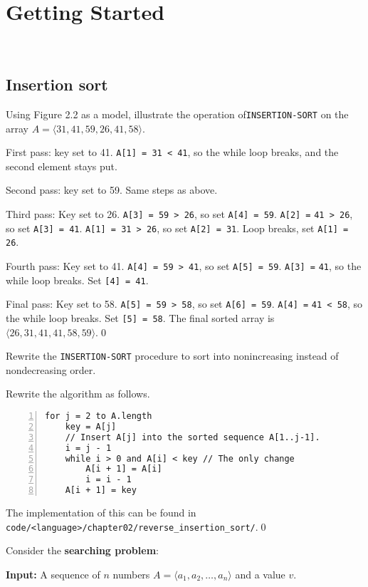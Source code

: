 \chapter{Getting Started}\,
\section{Insertion sort}

 Using Figure 2.2 as a model, illustrate the operation of\newline \verb|INSERTION-SORT| on the array $A = \langle 31, 41, 59, 26, 41, 58\rangle$.

\sol First pass: key set to 41. \verb|A[1] = 31 < 41|, so the while loop breaks, and the second element stays put.

Second pass: key set to 59. Same steps as above.

Third pass: Key set to 26. \verb|A[3] = 59 > 26|, so set \verb|A[4] = 59|. \verb|A[2] =| \verb|41 > 26|, so set \verb|A[3] = 41|. \verb|A[1] = 31 > 26|, so set \verb|A[2] = 31|. Loop breaks, set \verb|A[1] = 26|.

Fourth pass: Key set to 41. \verb|A[4] = 59 > 41|, so set \verb|A[5] = 59|. \verb|A[3] =| \verb|41|, so the while loop breaks. Set \verb|[4] = 41|.

Final pass: Key set to 58. \verb|A[5] = 59 > 58|, so set \verb|A[6] = 59|. \verb|A[4] =| \verb|41 < 58|, so the while loop breaks. Set \verb|[5] = 58|. The final sorted array is $\langle 26, 31, 41, 41, 58, 59\rangle$.\qed

 Rewrite the \verb|INSERTION-SORT| procedure to sort into nonincreasing instead of nondecreasing order.

\sol Rewrite the algorithm as follows.
\begin{Verbatim}[frame=single,numbers=left,samepage=true,label=REVERSE-INSERTION-SORT(A)]
for j = 2 to A.length
    key = A[j]
    // Insert A[j] into the sorted sequence A[1..j-1].
    i = j - 1
    while i > 0 and A[i] < key // The only change
        A[i + 1] = A[i]
        i = i - 1
    A[i + 1] = key
\end{Verbatim}

The implementation of this can be found in \newline\verb|code/<language>/chapter02/reverse_insertion_sort/|.\qed

 Consider the \textbf{searching problem}:

\textbf{Input:} A sequence of $n$ numbers $A = \langle a_1, a_2, \dots, a_n \rangle$ and a value $v$.

